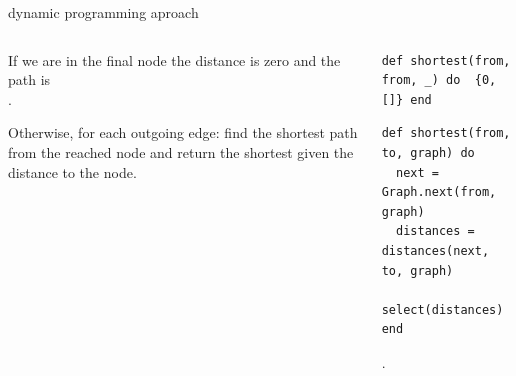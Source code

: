 \begin{frame}[fragile]{dynamic programming aproach}

\begin{columns}
 \begin{column}{0.4\linewidth}
  If we are in the final node the distance is zero and the path is \[\].

  \vspace{10pt}
  Otherwise, for each outgoing edge: find the shortest path from the
  reached node and return the shortest given the distance to the node.

 \end{column}
 \begin{column}{0.6\linewidth}
  \begin{verbatim}
def shortest(from, from, _) do  {0, []} end
  \end{verbatim}
  \pause
  \begin{verbatim}
def shortest(from, to, graph) do
  next = Graph.next(from, graph)
  distances = distances(next, to, graph)
  select(distances)
end
  \end{verbatim}
  .
 \end{column}
\end{columns}

\end{frame}

